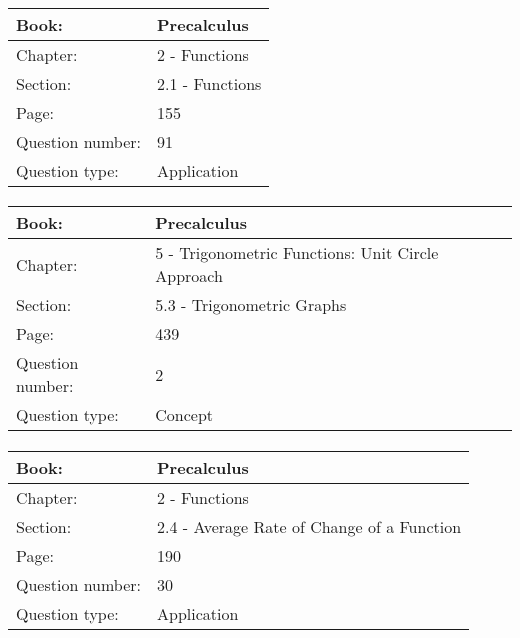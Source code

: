 \documentclass{article}
\begin{document}
   \paragraph{}
   \begin{tabularx}{1\textwidth}{
           p{}
           p{}
       }
       \toprule
       Book: & Precalculus
       \\
       \midrule
       Chapter: & 2 - Functions
       \\
       \midrule
       Section: & 2.1 - Functions
       \\
       \midrule
       Page: & 155
       \\
       \midrule
       Question number: & 91
       \\
       \midrule
       Question type: & Application
       \\
       \bottomrule
   \end{tabularx}



   \paragraph{}
   \begin{tabularx}{1\textwidth}{
           p{}
           p{}
       }
       \toprule
       Book: & Precalculus
       \\
       \midrule
       Chapter: & 5 - Trigonometric Functions: Unit Circle Approach
       \\
       \midrule
       Section: & 5.3 - Trigonometric Graphs
       \\
       \midrule
       Page: & 439
       \\
       \midrule
       Question number: & 2
       \\
       \midrule
       Question type: & Concept
       \\
       \bottomrule
   \end{tabularx}



   \paragraph{}
   \begin{tabularx}{1\textwidth}{
           p{}
           p{}
       }
       \toprule
       Book: & Precalculus
       \\
       \midrule
       Chapter: & 2 - Functions
       \\
       \midrule
       Section: & 2.4 - Average Rate of Change of a Function
       \\
       \midrule
       Page: & 190
       \\
       \midrule
       Question number: & 30
       \\
       \midrule
       Question type: & Application
       \\
       \bottomrule
   \end{tabularx}
\end{document}
